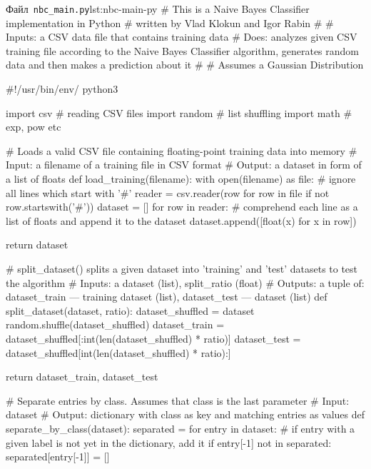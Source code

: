 \documentclass[
	a4paper,
	oneside,
	DIV = 12,
	fontsize = 13pt,
	headings = normal,
	numbers = endperiod,
	bibliography = totoc, %
]{scrartcl}
\theoremstyle{mythm}
\newcommand{\filename}[1]{\texttt{#1}}
\begin{document}
	\newpage
		\begin{listingpython}[toprule = 0pt, bottomrule = 0pt]{Файл~\filename{nbc\_main.py}}{lst:nbc-main-py}
# This is a Naive Bayes Classifier implementation in Python
# written by Vlad Klokun and Igor Rabin
#
# Inputs: a CSV data file that contains training data
# Does: analyzes given CSV training file according to the Naive Bayes Classifier algorithm, generates random data and then makes a prediction about it
#
# Assumes a Gaussian Distribution

#!/usr/bin/env/ python3

import csv # reading CSV files
import random # list shuffling
import math # exp, pow etc

# Loads a valid CSV file containing floating-point training data into memory
# Input: a filename of a training file in CSV format
# Output: a dataset in form of a list of floats
def load_training(filename):
    with open(filename) as file:
        # ignore all lines which start with '#'
        reader = csv.reader(row for row in file if not row.startswith('#'))
        dataset = []
        for row in reader:
            # comprehend each line as a list of floats and append it to the dataset
            dataset.append([float(x) for x in row])

    return dataset

# split_dataset() splits a given dataset into 'training' and 'test' datasets to test the algorithm
# Inputs: a dataset (list), split_ratio (float)
# Outputs: a tuple of: dataset_train --- training dataset (list), dataset_test --- dataset (list)
def split_dataset(dataset, ratio):
    dataset_shuffled = dataset
    random.shuffle(dataset_shuffled)
    dataset_train = dataset_shuffled[:int(len(dataset_shuffled) * ratio)]
    dataset_test = dataset_shuffled[int(len(dataset_shuffled) * ratio):]

    return dataset_train, dataset_test

# Separate entries by class. Assumes that class is the last parameter
# Input: dataset
# Output: dictionary with class as key and matching entries as values
def separate_by_class(dataset):
    separated = {}
    for entry in dataset:
        # if entry with a given label is not yet in the dictionary, add it
        if entry[-1] not in separated:
            separated[entry[-1]] = []


\end{listingpython}
\end{document}
